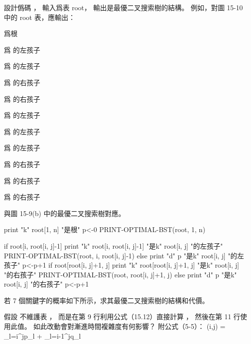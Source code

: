 \startsection[
  title={Optimal binary search trees},
]

\startEXERCISE
設計僞碼 ，
輸入爲表 root，
輸出是最優二叉搜索樹的結構。
例如，對圖 15-10 中的 root 表，應輸出：

\startigBase
\item {} 爲根
\item {} 爲  的左孩子
\item {} 爲  的左孩子
\item {} 爲  的右孩子
\item {} 爲  的右孩子
\item {} 爲  的左孩子
\item {} 爲  的左孩子
\item {} 爲  的左孩子
\item {} 爲  的右孩子
\item {} 爲  的右孩子
\item {} 爲  的右孩子
\stopigBase

與圖 15-9(b) 中的最優二叉搜索樹對應。
\stopEXERCISE

\startANSWER
{}
\startCLRS
print "k" root[1, n] "是根"
p<-0
PRINT-OPTIMAL-BST(root, 1, n)
\stopCLRS

\startCLRS
if root[i, root[i, j]-1]
	print "k" root[i, root[i, j]-1] "是k" root[i, j] "的左孩子"
	PRINT-OPTIMAL-BST(root, i, root[i, j]-1)
else
	print "d" p "是k" root[i, j] "的左孩子"
	p<-p+1
if root[root[i, j]+1, j]
	print "k" root[root[i, j]+1, j] "是k" root[i, j] "的右孩子"
	PRINT-OPTIMAL-BST(root, root[i, j]+1, j)
else
	print "d" p "是k" root[i, j] "的右孩子"
	p<-p+1
\stopCLRS
\stopANSWER

\startEXERCISE
若 7 個關鍵字的概率如下所示，求其最優二叉搜索樹的結構和代價。

\stopEXERCISE

\startANSWER
\externalfigure[output/e15_5_2-1]
\externalfigure[output/e15_5_2-2]
\externalfigure[output/e15_5_2-3]
\externalfigure[output/e15_5_2-4]
\stopANSWER

\startEXERCISE
假設  不維護表 \m{\omega[i,j]}，
而是在第 9 行利用公式（15.12）直接計算 ，
然後在第 11 行使用此值。
如此改動會對漸進時間複雜度有何影響？
附公式（5-5）：
\startformula
\omega(i,j) = \sum_{l=i}^{j}p_l + \sum_{l=i-1}^{j}q_l
\stopformula
\stopEXERCISE

